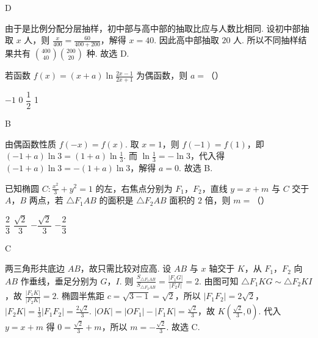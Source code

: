 \begin{answer}
D
\end{answer}

\begin{solution}
由于是比例分配分层抽样，初中部与高中部的抽取比应与人数比相同. 设初中部抽取 \(x\) 人，则 \(\frac{x}{400}=\frac{60}{400+200}\)，解得 \(x=40\). 因此高中部抽取 \(20\) 人. 所以不同抽样结果共有 \(\binom{400}{40}\binom{200}{20}\) 种. 故选 D.
\end{solution}

\begin{problem}
若函数 \(f(x)=(x+a)\ln\frac{2x-1}{2x+1}\) 为偶函数，则 \(a=\)（\quad）

\choices
    {\(-1\)}
    {0}
    {\(\dfrac12\)}
    {1}
\end{problem}

\begin{answer}
B
\end{answer}

\begin{solution}
由偶函数性质 \(f(-x)=f(x)\). 取 \(x=1\)，则 \(f(-1)=f(1)\)，即 \((-1+a)\ln 3=(1+a)\ln\frac13\).
而 \(\ln\frac13=-\ln 3\)，代入得 \((-1+a)\ln 3=-(1+a)\ln 3\)，解得 \(a=0\). 故选 B.
\end{solution}

\begin{problem}
已知椭圆 \(C:\frac{x^2}{3}+y^2=1\) 的左，右焦点分别为 \(F_1\)，\(F_2\)，直线 \(y=x+m\) 与 \(C\) 交于 \(A\)，\(B\) 两点，若 \(\triangle F_1AB\) 的面积是 \(\triangle F_2AB\) 面积的 \(2\) 倍，则 \(m=\)（\quad）

\choices
    {\(\dfrac23\)}
    {\(\dfrac{\sqrt2}{3}\)}
    {\(-\dfrac{\sqrt2}{3}\)}
    {\(-\dfrac23\)}
\end{problem}

\begin{answer}
C
\end{answer}

\begin{solution}
两三角形共底边 \(AB\)，故只需比较对应高. 设 \(AB\) 与 \(x\) 轴交于 \(K\)，从 \(F_1\)，\(F_2\) 向 \(AB\) 作垂线，垂足分别为 \(G\)，\(I\). 则 \(\frac{S_{\triangle F_1AB}}{S_{\triangle F_2AB}}=\frac{|F_1G|}{|F_2I|}=2\). 由图可知 \(\triangle F_1KG\sim \triangle F_2KI\)，故 \(\frac{|F_1K|}{|F_2K|}=2\). 椭圆半焦距 \(c=\sqrt{3-1}=\sqrt2\)，所以 \(|F_1F_2|=2\sqrt2\)，\(|F_2K|=\frac13|F_1F_2|=\frac{2\sqrt2}{3}\).
\( |OK|=|OF_1|-|F_1K|=\frac{\sqrt2}{3} \)，故 \(K\left(\frac{\sqrt2}{3},0\right)\). 代入 \(y=x+m\) 得 \(0=\frac{\sqrt2}{3}+m\)，所以 \(m=-\frac{\sqrt2}{3}\). 故选 C.


\end{solution}

